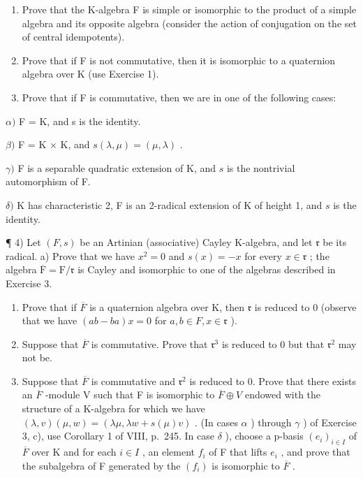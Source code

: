 \begin{enumerate}
\def\labelenumi{\alph{enumi})}
\item
  Prove that the K-algebra F is simple or isomorphic to the product of a simple algebra and its opposite algebra (consider the action of conjugation on the set of central idempotents).
\item
  Prove that if F is not commutative, then it is isomorphic to a quaternion algebra over K (use Exercise 1).
\item
  Prove that if F is commutative, then we are in one of the following cases:
\end{enumerate}

\(\alpha)\) F = K, and s is the identity.

\(\beta)\) F = K × K, and \(s(\lambda, \mu) = (\mu, \lambda)\) .

\(\gamma)\) F is a separable quadratic extension of K, and \(s\) is the nontrivial automorphism of F.

\(\delta)\) K has characteristic 2, F is an 2-radical extension of K of height 1, and \(s\) is the identity.

¶ 4) Let \((F, s)\) be an Artinian (associative) Cayley K-algebra, and let \(\mathfrak{r}\) be its radical. a) Prove that we have \(x^{2} = 0\) and \(s(x) = -x\) for every \(x \in \mathfrak{r}\) ; the algebra \(\overline{\mathrm{F}} = \mathrm{F} / \mathfrak{r}\) is Cayley and isomorphic to one of the algebras described in Exercise 3.

\begin{enumerate}
\def\labelenumi{\alph{enumi})}
\setcounter{enumi}{1}
\item
  Prove that if \(\overline{F}\) is a quaternion algebra over K, then \(\mathfrak{r}\) is reduced to 0 (observe that we have \((ab - ba)x = 0\) for \(a, b \in F, x \in \mathfrak{r}\) ).
\item
  Suppose that \(\overline{F}\) is commutative. Prove that \(\mathfrak{r}^{3}\) is reduced to 0 but that \(\mathfrak{r}^{2}\) may not be.
\item
  Suppose that \(\overline{F}\) is commutative and \(\mathfrak{r}^{2}\) is reduced to 0. Prove that there exists an \(\overline{F}\) -module V such that F is isomorphic to \(\overline{F} \oplus V\) endowed with the structure of a K-algebra for which we have \((\lambda, v)(\mu, w) = (\lambda \mu, \lambda w + s(\mu) v)\) . (In cases \(\alpha\) ) through \(\gamma\) ) of Exercise 3, c), use Corollary 1 of VIII, p.~245. In case \(\delta\) ), choose a p-basis \((e_{i})_{i \in I}\) of \(\overline{F}\) over K and for each \(i \in I\) , an element \(f_{i}\) of F that lifts \(e_{i}\) , and prove that the subalgebra of F generated by the \((f_{i})\) is isomorphic to \(\overline{F}\) .
\end{enumerate}

